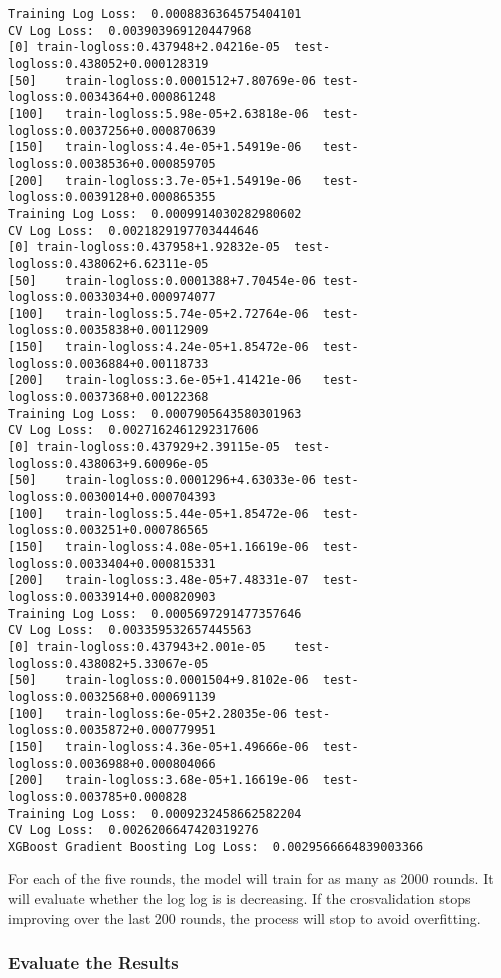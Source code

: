 \documentclass[11pt]{article}
\begin{document}
    \begin{Verbatim}[commandchars=\\\{\}]
Training Log Loss:  0.0008836364575404101
CV Log Loss:  0.003903969120447968
[0]	train-logloss:0.437948+2.04216e-05	test-logloss:0.438052+0.000128319
[50]	train-logloss:0.0001512+7.80769e-06	test-logloss:0.0034364+0.000861248
[100]	train-logloss:5.98e-05+2.63818e-06	test-logloss:0.0037256+0.000870639
[150]	train-logloss:4.4e-05+1.54919e-06	test-logloss:0.0038536+0.000859705
[200]	train-logloss:3.7e-05+1.54919e-06	test-logloss:0.0039128+0.000865355
Training Log Loss:  0.0009914030282980602
CV Log Loss:  0.0021829197703444646
[0]	train-logloss:0.437958+1.92832e-05	test-logloss:0.438062+6.62311e-05
[50]	train-logloss:0.0001388+7.70454e-06	test-logloss:0.0033034+0.000974077
[100]	train-logloss:5.74e-05+2.72764e-06	test-logloss:0.0035838+0.00112909
[150]	train-logloss:4.24e-05+1.85472e-06	test-logloss:0.0036884+0.00118733
[200]	train-logloss:3.6e-05+1.41421e-06	test-logloss:0.0037368+0.00122368
Training Log Loss:  0.0007905643580301963
CV Log Loss:  0.0027162461292317606
[0]	train-logloss:0.437929+2.39115e-05	test-logloss:0.438063+9.60096e-05
[50]	train-logloss:0.0001296+4.63033e-06	test-logloss:0.0030014+0.000704393
[100]	train-logloss:5.44e-05+1.85472e-06	test-logloss:0.003251+0.000786565
[150]	train-logloss:4.08e-05+1.16619e-06	test-logloss:0.0033404+0.000815331
[200]	train-logloss:3.48e-05+7.48331e-07	test-logloss:0.0033914+0.000820903
Training Log Loss:  0.0005697291477357646
CV Log Loss:  0.003359532657445563
[0]	train-logloss:0.437943+2.001e-05	test-logloss:0.438082+5.33067e-05
[50]	train-logloss:0.0001504+9.8102e-06	test-logloss:0.0032568+0.000691139
[100]	train-logloss:6e-05+2.28035e-06	test-logloss:0.0035872+0.000779951
[150]	train-logloss:4.36e-05+1.49666e-06	test-logloss:0.0036988+0.000804066
[200]	train-logloss:3.68e-05+1.16619e-06	test-logloss:0.003785+0.000828
Training Log Loss:  0.0009232458662582204
CV Log Loss:  0.0026206647420319276
XGBoost Gradient Boosting Log Loss:  0.0029566664839003366

    \end{Verbatim}

    For each of the five rounds, the model will train for as many as 2000
rounds. It will evaluate whether the log log is is decreasing. If the
crosvalidation stops improving over the last 200 rounds, the process
will stop to avoid overfitting.

\subsubsection{Evaluate the Results}\label{evaluate-the-results}
\end{document}
